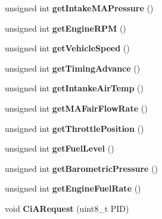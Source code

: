 \begin{DoxyCompactItemize}
\item 
unsigned int {\bfseries get\+Intake\+M\+A\+Pressure} ()\hypertarget{class_wasp_c_a_n_a39e0947cc57b78bd257ded82b5fb7c65}{}\label{class_wasp_c_a_n_a39e0947cc57b78bd257ded82b5fb7c65}

\item 
unsigned int {\bfseries get\+Engine\+R\+PM} ()\hypertarget{class_wasp_c_a_n_ab65854ed8cb0a9065438b3a122dd90fb}{}\label{class_wasp_c_a_n_ab65854ed8cb0a9065438b3a122dd90fb}

\item 
unsigned int {\bfseries get\+Vehicle\+Speed} ()\hypertarget{class_wasp_c_a_n_a2592fd57989064cbff70cad321b94dce}{}\label{class_wasp_c_a_n_a2592fd57989064cbff70cad321b94dce}

\item 
unsigned int {\bfseries get\+Timing\+Advance} ()\hypertarget{class_wasp_c_a_n_aca174a9e005071f5a84605fcfd5a5b2a}{}\label{class_wasp_c_a_n_aca174a9e005071f5a84605fcfd5a5b2a}

\item 
unsigned int {\bfseries get\+Intanke\+Air\+Temp} ()\hypertarget{class_wasp_c_a_n_af1d48289e89fbcab1f8b179e63ca8978}{}\label{class_wasp_c_a_n_af1d48289e89fbcab1f8b179e63ca8978}

\item 
unsigned int {\bfseries get\+M\+A\+Fair\+Flow\+Rate} ()\hypertarget{class_wasp_c_a_n_a6be7a970525d300d2185e3628168de4a}{}\label{class_wasp_c_a_n_a6be7a970525d300d2185e3628168de4a}

\item 
unsigned int {\bfseries get\+Throttle\+Position} ()\hypertarget{class_wasp_c_a_n_a98db882684d841d6571ed83a6eeba755}{}\label{class_wasp_c_a_n_a98db882684d841d6571ed83a6eeba755}

\item 
unsigned int {\bfseries get\+Fuel\+Level} ()\hypertarget{class_wasp_c_a_n_ac90af58fa6440e77d42915c580ec3d9b}{}\label{class_wasp_c_a_n_ac90af58fa6440e77d42915c580ec3d9b}

\item 
unsigned int {\bfseries get\+Barometric\+Pressure} ()\hypertarget{class_wasp_c_a_n_a32f64257154ed97e45a40c875568599e}{}\label{class_wasp_c_a_n_a32f64257154ed97e45a40c875568599e}

\item 
unsigned int {\bfseries get\+Engine\+Fuel\+Rate} ()\hypertarget{class_wasp_c_a_n_a653b583005afed9a7e7484b41928019b}{}\label{class_wasp_c_a_n_a653b583005afed9a7e7484b41928019b}

\item 
void {\bfseries Ci\+A\+Request} (uint8\+\_\+t P\+ID)\hypertarget{class_wasp_c_a_n_abe115d1f03b39134c7b2168a69e1b65f}{}\label{class_wasp_c_a_n_abe115d1f03b39134c7b2168a69e1b65f}

\end{DoxyCompactItemize}

